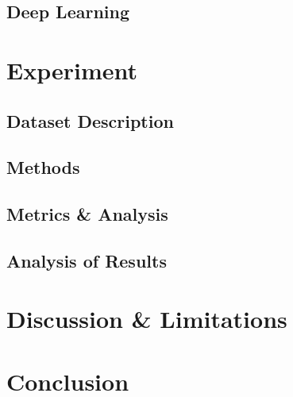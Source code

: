 
\subsection{Deep Learning} %
\label{sub:deep_learning}


\section{Experiment} %
\label{sec:experiment}

\subsection{Dataset Description} %
\label{sub:dataset_description}


\subsection{Methods} %
\label{sub:methods}


\subsection{Metrics \& Analysis} %
\label{sub:metrics_&_analysis}


\subsection{Analysis of Results} %
\label{sub:analysis_of_results}



\section{Discussion \& Limitations} %
\label{sec:discussion_&_limitations}


\section{Conclusion} %
\label{sec:conclusion}

